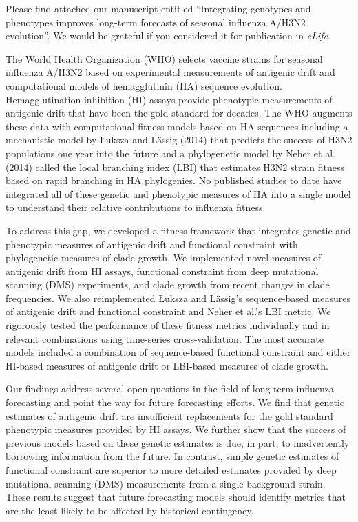 \documentclass[stdletter,letterpaper,addrfromright,orderfromdateto,dateleft,11pt,noaddrto,sigleft]{newlfm}
\begin{document}
\begin{newlfm}
  Please find attached our manuscript entitled ``Integrating genotypes and phenotypes improves long-term forecasts of seasonal influenza A/H3N2 evolution''.
  We would be grateful if you considered it for publication in \textit{eLife}.

  The World Health Organization (WHO) selects vaccine strains for seasonal influenza A/H3N2 based on experimental measurements of antigenic drift and computational models of hemagglutinin (HA) sequence evolution.
  Hemagglutination inhibition (HI) assays provide phenotypic measurements of antigenic drift that have been the gold standard for decades.
  The WHO augments these data with computational fitness models based on HA sequences including a mechanistic model by {\L}uksza and L{\"a}ssig (2014) that predicts the success of H3N2 populations one year into the future and a phylogenetic model by Neher et al. (2014) called the local branching index (LBI) that estimates H3N2 strain fitness based on rapid branching in HA phylogenies.
  No published studies to date have integrated all of these genetic and phenotypic measures of HA into a single model to understand their relative contributions to influenza fitness.

  To address this gap, we developed a fitness framework that integrates genetic and phenotypic measures of antigenic drift and functional constraint with phylogenetic measures of clade growth.
  We implemented novel measures of antigenic drift from HI assays, functional constraint from deep mutational scanning (DMS) experiments, and clade growth from recent changes in clade frequencies.
  We also reimplemented {\L}uksza and L{\"a}ssig's sequence-based measures of antigenic drift and functional constraint and Neher et al.'s LBI metric.
  We rigorously tested the performance of these fitness metrics individually and in relevant combinations using time-series cross-validation.
  The most accurate models included a combination of sequence-based functional constraint and either HI-based measures of antigenic drift or LBI-based measures of clade growth.

  Our findings address several open questions in the field of long-term influenza forecasting and point the way for future forecasting efforts.
  We find that genetic estimates of antigenic drift are insufficient replacements for the gold standard phenotypic measures provided by HI assays.
  We further show that the success of previous models based on these genetic estimates is due, in part, to inadvertently borrowing information from the future.
  In contrast, simple genetic estimates of functional constraint are superior to more detailed estimates provided by deep mutational scanning (DMS) measurements from a single background strain.
  These results suggest that future forecasting models should identify metrics that are the least likely to be affected by historical contingency.


\end{newlfm}
\end{document}
